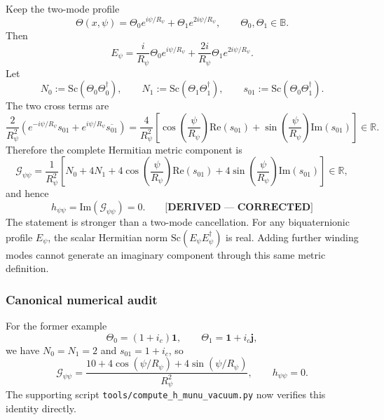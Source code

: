 Keep the two-mode profile
\begin{equation}
  \Theta(x,\psi)=\Theta_0e^{i\psi/R_\psi}
                 +\Theta_1e^{2i\psi/R_\psi},
  \label{eq:two_mode_ansatz}
  \qquad \Theta_0,\Theta_1\in\mathbb B.
\end{equation}
Then
\begin{equation}
  E_\psi=\frac{i}{R_\psi}\Theta_0e^{i\psi/R_\psi}
        +\frac{2i}{R_\psi}\Theta_1e^{2i\psi/R_\psi}.
  \label{eq:two_mode_E_psi}
\end{equation}
Let
\[
 N_0:=\mathrm{Sc}(\Theta_0\Theta_0^\dagger),\qquad
 N_1:=\mathrm{Sc}(\Theta_1\Theta_1^\dagger),\qquad
 s_{01}:=\mathrm{Sc}(\Theta_0\Theta_1^\dagger).
\]
The two cross terms are
\begin{equation}
 \frac{2}{R_\psi^2}\left(
 e^{-i\psi/R_\psi}s_{01}
 +e^{i\psi/R_\psi}\overline{s_{01}}
 \right)
 =\frac{4}{R_\psi^2}\left[
 \cos\!\left(\frac{\psi}{R_\psi}\right)\mathrm{Re}(s_{01})
 +\sin\!\left(\frac{\psi}{R_\psi}\right)\mathrm{Im}(s_{01})
 \right]\in\mathbb R.
 \label{eq:cross_sum}
\end{equation}
Therefore the complete Hermitian metric component is
\begin{equation}
 \boxed{
 \mathcal G_{\psi\psi}
 =\frac1{R_\psi^2}\left[
 N_0+4N_1
 +4\cos\!\left(\frac{\psi}{R_\psi}\right)\mathrm{Re}(s_{01})
 +4\sin\!\left(\frac{\psi}{R_\psi}\right)\mathrm{Im}(s_{01})
 \right]\in\mathbb R,}
 \label{eq:cross_sum_expanded}
\end{equation}
and hence
\begin{equation}
 \boxed{h_{\psi\psi}=\mathrm{Im}(\mathcal G_{\psi\psi})=0.}
 \label{eq:h_psipsi_result}
 \qquad\textbf{[DERIVED --- CORRECTED]}
\end{equation}
The statement is stronger than a two-mode cancellation.  For any
biquaternionic profile $E_\psi$, the scalar Hermitian norm
$\mathrm{Sc}(E_\psi E_\psi^\dagger)$ is real.  Adding further winding modes
cannot generate an imaginary component through this same metric definition.

\subsubsection{Canonical numerical audit}

For the former example
\begin{equation}
 \Theta_0=(1+i_c)\mathbf 1,\qquad
 \Theta_1=\mathbf 1+i_c\mathbf j,
 \label{eq:canonical_theta_choice}
\end{equation}
we have $N_0=N_1=2$ and $s_{01}=1+i_c$, so
\begin{equation}
 \mathcal G_{\psi\psi}
 =\frac{10+4\cos(\psi/R_\psi)+4\sin(\psi/R_\psi)}{R_\psi^2},
 \qquad h_{\psi\psi}=0.
 \label{eq:h_psipsi_canonical}
\end{equation}
The supporting script
\texttt{tools/compute\_h\_munu\_vacuum.py} now verifies this identity directly.

